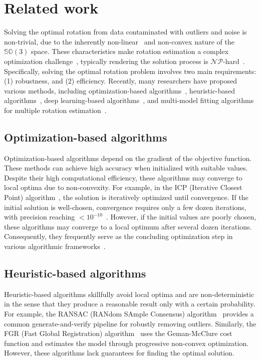 \section{Related work}
Solving the optimal rotation from data contaminated with outliers and noise is non-trivial, due to the inherently non-linear~\cite{chin2022maximum} and non-convex\cite{brynte2022tightness} nature of the \(\mathbb{SO}(3)\) space. These characteristics make rotation estimation a complex optimization challenge~\cite{bustos2016robust}, typically rendering the solution process is \(\mathcal{NP}\)-hard~\cite{peng2022arcs}. Specifically, solving the optimal rotation problem involves two main requirements: (1) robustness, and (2) efficiency. Recently, many researchers have proposed various methods, including optimization-based algorithms~\cite{maken2019speeding}, heuristic-based algorithms~\cite{nuchter2005heuristic}, deep learning-based algorithms~\cite{2021Deep}, and multi-model fitting algorithms for multiple rotation estimation~\cite{kluger2020consac}.
\subsection{Optimization-based algorithms}
Optimization-based algorithms depend on the gradient of the objective function. These methods can achieve high accuracy when initialized with suitable values. Despite their high computational efficiency, these algorithms may converge to local optima due to non-convexity. For example, in the ICP (Iterative Closest Point) algorithm~\cite{1992A}, the solution is iteratively optimized until convergence. If the initial solution is well-chosen, convergence requires only a few dozen iterations, with precision reaching \(<10^{-10}\)~\cite{wright2006numerical}. However, if the initial values are poorly chosen, these algorithms may converge to a local optimum after several dozen iterations. Consequently, they frequently serve as the concluding optimization step in various algorithmic frameworks~\cite{wright2006numerical}.
\subsection{Heuristic-based algorithms}
Heuristic-based algorithms skillfully avoid local optima and are non-deterministic in the sense that they produce a reasonable result only with a certain probability. For example, the RANSAC (RANdom SAmple Consensus) algorithm~\cite{fischler1981random} provides a common generate-and-verify pipeline for robustly removing outliers. Similarly, the FGR (Fast Global Registration) algorithm~\cite{2016Fast} uses the Geman-McClure cost function and estimates the model through progressive non-convex optimization. However, these algorithms lack guarantees for finding the optimal solution.
